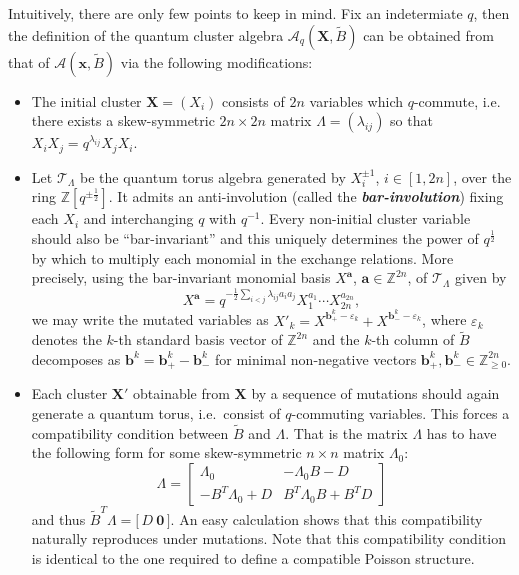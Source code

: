 \documentclass[12pt]{amsart}
\newcommand{\bfa}{\mathbf{a}}
\newcommand{\bfb}{\mathbf{b}}
\newcommand{\bfx}{\mathbf{x}}
\newcommand{\bfX}{\mathbf{X}}
\newcommand{\cA}{\mathcal{A}}
\newcommand{\cT}{\mathcal{T}}
\newcommand{\half}{{\frac{1}{2}}}
\newcommand{\ZZ}{\mathbb{Z}}
\newcommand{\newword}[1]{\textbf{\emph{#1}}}
\begin{document}
  Intuitively, there are only few points to keep in mind.
  Fix an indetermiate $q$, then the definition of the quantum cluster algebra $\cA_q(\bfX,\widetilde B)$ can be obtained from that of $\cA(\bfx,\widetilde B)$ via the following modifications:
  \begin{itemize}
    \item 
      The initial cluster $\bfX=(X_i)$ consists of $2n$ variables which $q$-commute, i.e. there exists a skew-symmetric $2n\times 2n$ matrix $\Lambda=(\lambda_{ij})$ so that $X_iX_j=q^{\lambda_{ij}}X_jX_i$.  
    
    \item 
      Let $\cT_\Lambda$ be the quantum torus algebra generated by $X_i^{\pm1}$, $i\in[1,2n]$, over the ring $\ZZ[q^{\pm\half}]$.
      It admits an anti-involution (called the \newword{bar-involution}) fixing each $X_i$ and interchanging $q$ with $q^{-1}$.
      Every non-initial cluster variable should also be ``bar-invariant'' and this uniquely determines the power of $q^\half$ by which to multiply each monomial in the exchange relations.  
      More precisely, using the bar-invariant monomial basis $X^\bfa$, $\bfa\in\ZZ^{2n}$, of $\cT_\Lambda$ given by
      \[
        X^\bfa=q^{-\half\sum\limits_{i<j}\lambda_{ij}a_ia_j}X_1^{a_1}\cdots X_{2n}^{a_{2n}},
      \]
      we may write the mutated variables as $X'_k=X^{\bfb_+^k-\varepsilon_k}+X^{\bfb_-^k-\varepsilon_k}$, where $\varepsilon_k$ denotes the $k$-th standard basis vector of $\ZZ^{2n}$ and the $k$-th column of $\widetilde{B}$ decomposes as $\bfb^k=\bfb^k_+-\bfb^k_-$ for minimal non-negative vectors $\bfb^k_+,\bfb^k_-\in\ZZ_{\ge0}^{2n}$.

    \item 
      Each cluster $\bfX'$ obtainable from $\bfX$ by a sequence of mutations should again generate a quantum torus, i.e.\ consist of $q$-commuting variables.
      This forces a compatibility condition between $\widetilde{B}$ and $\Lambda$.
      That is the matrix $\Lambda$ has to have the following form for some skew-symmetric $n\times n$ matrix $\Lambda_0$:
      \[
        \Lambda
        =
        \left[
          \begin{array}{cc}
            \Lambda_0 & -\Lambda_0B-D\\ 
            -B^T\Lambda_0+D & B^T\Lambda_0B+B^TD
          \end{array}
        \right]
      \]
      and thus $\widetilde{B}^T\Lambda=\big[\,D\ \boldsymbol{0}\,\big]$.
      An easy calculation shows that this compatibility naturally reproduces under mutations.
      Note that this compatibility condition is identical to the one required to define a compatible Poisson structure.

  \end{itemize}
\end{document}
